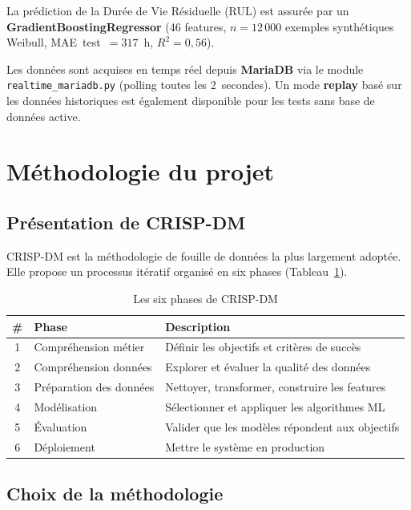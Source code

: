 \documentclass[12pt,a4paper]{report}
\begin{document}
La prédiction de la Durée de Vie Résiduelle (RUL) est assurée par un
\textbf{GradientBoostingRegressor} (46 features, $n=12\,000$ exemples synthétiques
Weibull, MAE~test~$=317$~h, $R^2=0{,}56$).

Les données sont acquises en temps réel depuis \textbf{MariaDB} via le module
\texttt{realtime\_mariadb.py} (polling toutes les 2~secondes). Un mode \textbf{replay}
basé sur les données historiques est également disponible pour les tests sans base de données active.

\section{Méthodologie du projet}

\subsection{Présentation de CRISP-DM}

CRISP-DM est la méthodologie de fouille de données la plus largement adoptée.
Elle propose un processus itératif organisé en six phases (Tableau~\ref{tab:crispdm}).

\begin{table}[h]
\centering
\caption{Les six phases de CRISP-DM}
\label{tab:crispdm}
\begin{tabular}{clp{8cm}}
\toprule
\textbf{\#} & \textbf{Phase} & \textbf{Description} \\
\midrule
1 & Compréhension métier   & Définir les objectifs et critères de succès \\
2 & Compréhension données  & Explorer et évaluer la qualité des données \\
3 & Préparation des données & Nettoyer, transformer, construire les features \\
4 & Modélisation           & Sélectionner et appliquer les algorithmes ML \\
5 & Évaluation             & Valider que les modèles répondent aux objectifs \\
6 & Déploiement            & Mettre le système en production \\
\bottomrule
\end{tabular}
\end{table}

\subsection{Choix de la méthodologie}
\end{document}
